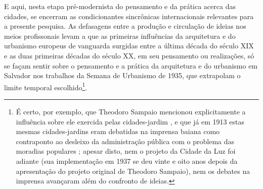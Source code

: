 E aqui, nesta etapa pré-modernista do pensamento e da prática acerca das cidades, se encerram as condicionantes sincrônicas internacionais relevantes para a presente pesquisa. As defasagens entre a produção e circulação de ideias nos meios profissonais levam a que as primeiras influências da arquitetura e do urbanismo europeus de vanguarda surgidas entre a última década do século XIX e as duas primeiras décadas do século XX, em seu pensamento ou realizações, só se façam sentir sobre o pensamento e a prática da arquitetura e do urbanismo em Salvador nos trabalhos da Semana de Urbanismo de 1935, que extrapolam o limite temporal escolhido\footnote{É certo, por exemplo, que Theodoro Sampaio mencionou explicitamente a influência sobre ele exercida pelas cidades-jardim \cite{costa1996theodoro}, e que já em 1913 estas mesmas cidades-jardins eram debatidas na imprensa baiana como contraponto ao desleixo da administração pública com o problema das moradias populares \cite{flexor_salvadorverde_2000}; apesar disto, nem o projeto da Cidade da Luz foi adiante (sua implementação em 1937 se deu vinte e oito anos depois da apresentação do projeto original de Theodoro Sampaio), nem os debates na imprensa avançaram além do confronto de ideias.}.